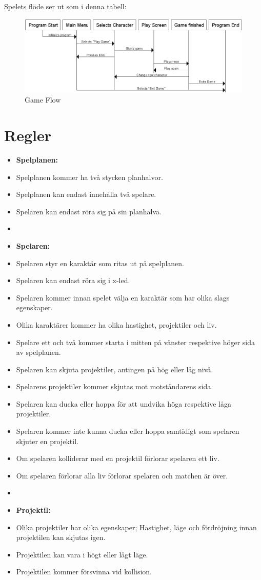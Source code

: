 \documentclass{TDP003mall}
\begin{document}
\newpage
Spelets flöde ser ut som i denna tabell:
\begin{figure}[H] \label{gameflow}
    \centering
    \includegraphics[width = \linewidth]{flow.png}
    \caption{Game Flow}
    \label{fig:Game Flow}
\end{figure}

\newpage

\section{Regler}
\begin{itemize}
\item[] \textbf{Spelplanen:}
\item[] Spelplanen kommer ha två stycken planhalvor.
\item[] Spelplanen kan endast innehålla två spelare.
\item[] Spelaren kan endast röra sig på sin planhalva.
\item[]
\item[] \textbf{Spelaren:}
\item[] Spelaren styr en karaktär som ritas ut på spelplanen.
\item[] Spelaren kan endast röra sig i x-led.
\item[] Spelaren kommer innan spelet välja en karaktär som har olika slags egenskaper.
\item[] Olika karaktärer kommer ha olika hastighet, projektiler och liv.
\item[] Spelare ett och två kommer starta i mitten på vänster respektive höger sida av spelplanen.
\item[] Spelaren kan skjuta projektiler, antingen på hög eller låg nivå.
\item[] Spelarens projektiler kommer skjutas mot motståndarens sida.
\item[] Spelaren kan ducka eller hoppa för att undvika höga respektive låga projektiler.
\item[] Spelaren kommer inte kunna ducka eller hoppa samtidigt som spelaren skjuter en projektil.
\item[] Om spelaren kolliderar med en projektil förlorar spelaren ett liv.
\item[] Om spelaren förlorar alla liv förlorar spelaren och matchen är över.
\item[] 
\item[] \textbf{Projektil:}
\item[] Olika projektiler har olika egenskaper; Hastighet, läge och fördröjning innan projektilen kan skjutas igen.
\item[] Projektilen kan vara i högt eller lågt läge.
\item[] Projektilen kommer försvinna vid kollision.
\end{itemize}
\end{document}
